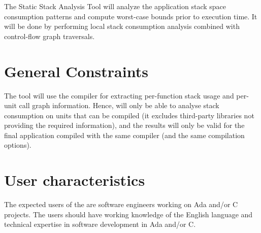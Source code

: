 The Static Stack Analysis Tool will analyze the application stack
space consumption patterns and compute worst-case bounds prior to
execution time. It will be done by performing local stack consumption
analysis combined with control-flow graph traversals.

\section{General Constraints}

The tool will use the compiler for extracting per-function stack usage
and per-unit call graph information. Hence, \ssat{} will only be able to
analyse stack consumption on units that can be compiled (it excludes
third-party libraries not providing the required information), and the
results will only be valid for the final application compiled with the
same compiler (and the same compilation options).

\section{User characteristics}

The expected users of the \ssat{} are software engineers working on Ada
and/or C projects. The users should have working knowledge of the
English language and technical expertise in software development in
Ada and/or C.

